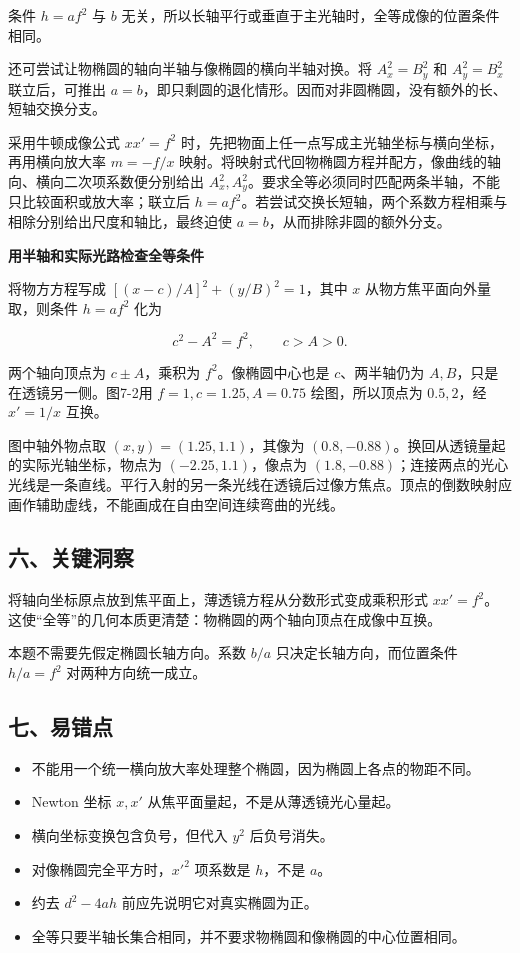 \documentclass[12pt,a4paper,UTF8]{ctexart}
\newcommand{\tightlist}{\setlength{\itemsep}{0pt}\setlength{\parskip}{0pt}}
\begin{document}
条件 \(h=af^2\) 与 \(b\)
无关，所以长轴平行或垂直于主光轴时，全等成像的位置条件相同。

还可尝试让物椭圆的轴向半轴与像椭圆的横向半轴对换。将 \(A_x^2=B_y^2\) 和
\(A_y^2=B_x^2\) 联立后，可推出
\(a=b\)，即只剩圆的退化情形。因而对非圆椭圆，没有额外的长、短轴交换分支。

采用牛顿成像公式 \(xx'=f^2\)
时，先把物面上任一点写成主光轴坐标与横向坐标，再用横向放大率 \(m=-f/x\)
映射。将映射式代回物椭圆方程并配方，像曲线的轴向、横向二次项系数便分别给出
\(A_x^2,A_y^2\)。要求全等必须同时匹配两条半轴，不能只比较面积或放大率；联立后
\(h=af^2\)。若尝试交换长短轴，两个系数方程相乘与相除分别给出尺度和轴比，最终迫使
\(a=b\)，从而排除非圆的额外分支。

\textbf{用半轴和实际光路检查全等条件}

将物方方程写成 \([(x-c)/A]^2+(y/B)^2=1\)，其中 \(x\)
从物方焦平面向外量取，则条件 \(h=af^2\) 化为

\[c^2-A^2=f^2,\qquad c>A>0.\]

两个轴向顶点为 \(c\pm A\)，乘积为 \(f^2\)。像椭圆中心也是
\(c\)、两半轴仍为 \(A,B\)，只是在透镜另一侧。图7-2用
\(f=1,c=1.25,A=0.75\) 绘图，所以顶点为 \(0.5,2\)，经 \(x'=1/x\) 互换。

图中轴外物点取 \((x,y)=(1.25,1.1)\)，其像为
\((0.8,-0.88)\)。换回从透镜量起的实际光轴坐标，物点为
\((-2.25,1.1)\)，像点为
\((1.8,-0.88)\)；连接两点的光心光线是一条直线。平行入射的另一条光线在透镜后过像方焦点。顶点的倒数映射应画作辅助虚线，不能画成在自由空间连续弯曲的光线。

\subsection{六、关键洞察}\label{ux516dux5173ux952eux6d1eux5bdf-6}

将轴向坐标原点放到焦平面上，薄透镜方程从分数形式变成乘积形式
\(xx'=f^2\)。这使``全等''的几何本质更清楚：物椭圆的两个轴向顶点在成像中互换。

本题不需要先假定椭圆长轴方向。系数 \(b/a\) 只决定长轴方向，而位置条件
\(h/a=f^2\) 对两种方向统一成立。

\subsection{七、易错点}\label{ux4e03ux6613ux9519ux70b9-6}

\begin{itemize}
\tightlist
\item
  不能用一个统一横向放大率处理整个椭圆，因为椭圆上各点的物距不同。
\item
  Newton 坐标 \(x,x'\) 从焦平面量起，不是从薄透镜光心量起。
\item
  横向坐标变换包含负号，但代入 \(y^2\) 后负号消失。
\item
  对像椭圆完全平方时，\(x'^2\) 项系数是 \(h\)，不是 \(a\)。
\item
  约去 \(d^2-4ah\) 前应先说明它对真实椭圆为正。
\item
  全等只要半轴长集合相同，并不要求物椭圆和像椭圆的中心位置相同。
\end{itemize}
\end{document}
